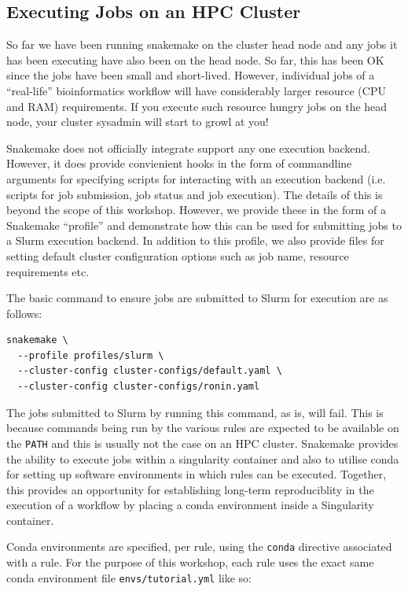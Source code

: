 \subsection{Executing Jobs on an HPC Cluster}

So far we have been running snakemake on the cluster head node and any jobs it has been executing have also been on the head node. So far, this has been OK
since the jobs have been small and short-lived. However, individual jobs of a ``real-life'' bioinformatics workflow will have considerably larger resource
(CPU and RAM) requirements. If you execute such resource hungry jobs on the head node, your cluster sysadmin will start to growl at you!

Snakemake does not officially integrate support any one execution backend. However, it does provide convienient hooks in the form of commandline arguments for specifying
scripts for interacting with an execution backend (i.e. scripts for job submission, job status and job execution). The details of this is beyond the scope of this
workshop. However, we provide these in the form of a Snakemake ``profile'' and demonstrate how this can be used for submitting jobs to a Slurm execution backend.
In addition to this profile, we also provide files for setting default cluster configuration options such as job name, resource requirements etc.

The basic command to ensure jobs are submitted to Slurm for execution are as follows:

\begin{lstlisting}
snakemake \
  --profile profiles/slurm \
  --cluster-config cluster-configs/default.yaml \
  --cluster-config cluster-configs/ronin.yaml
\end{lstlisting}

The jobs submitted to Slurm by running this command, as is, will fail. This is because commands being run by the various rules are expected to be available on the \texttt{PATH}
and this is usually not the case on an HPC cluster. Snakemake provides the ability to execute jobs within a singularity container and also to utilise conda for setting 
up software environments in which rules can be executed. Together, this provides an opportunity for establishing long-term reproduciblity in the execution of a workflow by placing
a conda environment inside a Singularity container.

Conda environments are specified, per rule, using the \texttt{conda} directive associated with a rule. For the purpose of this workshop, each rule uses the exact same conda
environment file \texttt{envs/tutorial.yml} like so:

